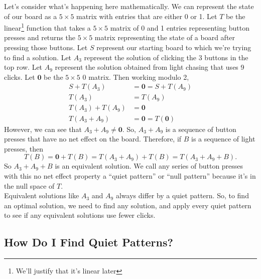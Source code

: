 \documentclass[a4paper]{article}
\begin{document}
	Let's consider what's happening here mathematically.
	We can represent the state of our board as a $5 \times 5$ matrix with entries that are either 0 or 1.
	Let $T$ be the linear\footnote{We'll justify that it's linear later} function that takes a $5 \times 5$ matrix of 0 and 1 entries representing button presses and returns the $5 \times 5$ matrix representing the state of a board after pressing those buttons.
	Let $S$ represent our starting board to which we're trying to find a solution.
	Let $A_3$ represent the solution of clicking the 3 buttons in the top row.
	Let $A_9$ represent the solution obtained from light chasing that uses 9 clicks.
	Let $\mathbf{0}$ be the $5 \times 5$ 0 matrix.
	Then working modulo 2,
	\begin{align*}
		S + T(A_3) &= \mathbf{0} = S + T(A_9) \\
		T(A_3) &= T(A_9) \\
		T(A_3) + T(A_9) &= \mathbf{0} \\
		T(A_3 + A_9) &= \mathbf{0} = T(\mathbf{0})
	\end{align*}
	However, we can see that $A_3 + A_9 \neq \mathbf{0}$.
	So, $A_3 + A_9$ is a sequence of button presses that have no net effect on the board.
	Therefore, if $B$ is a sequence of light presses, then
	\begin{equation*}
		T(B) = \mathbf{0} + T(B) = T(A_3 + A_9) + T(B) = T(A_3 + A_9 + B).
	\end{equation*}
	So $A_3 + A_9 + B$ is an equivalent solution.
	We call any series of button presses with this no net effect property a ``quiet pattern'' or ``null pattern'' because it's in the null space of $T$. \\
	
	Equivalent solutions like $A_3$ and $A_9$ always differ by a quiet pattern.
	So, to find an optimal solution, we need to find any solution, and apply every quiet pattern to see if any equivalent solutions use fewer clicks. 
	
	\subsection{How Do I Find Quiet Patterns?}
\end{document}
